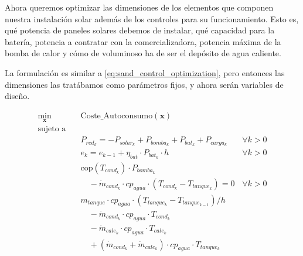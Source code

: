 Ahora queremos optimizar las dimensiones de los elementos que componen nuestra
instalación solar además de los controles para su funcionamiento. Esto es, qué
potencia de paneles solares debemos de instalar, qué capacidad para la batería,
potencia a contratar con la comercializadora, potencia máxima de la bomba de
calor y cómo de voluminoso ha de ser el depósito de agua caliente.

La formulación es similar a \eqref{eq:sand_control_optimization}, pero entonces
las dimensiones las tratábamos como parámetros fijos, y ahora serán variables
de diseño.

\begin{align}
	\min_{\mathbf{x}} \quad & \text{Coste\_Autoconsumo}(\mathbf{x}) \label{eq:regulated_sizing_optimization}                                                   \\
	\text{sujeto a} \quad   & \nonumber                                                                                                                        \\
	                        & P_{red_k} = -P_{solar_k} + P_{bomba_k} + P_{bat_k} + P_{carga_k} \quad                                           & \forall k > 0 \\
	                        & e_k = e_{k-1} + \eta_{bat} \cdot P_{bat_k} \cdot h \quad                                                         & \forall k > 0 \\
	                        & \text{cop}(T_{cond_k}) \cdot P_{bomba_k} \nonumber                                                                               \\
	                        & \quad - \dot{m}_{cond_k} \cdot cp_{agua} \cdot (T_{cond_k} - T_{tanque_k}) = 0                                   & \forall k > 0 \\
	                        & m_{tanque} \cdot cp_{agua} \cdot ( T_{tanque_k} - T_{tanque_{k-1}}) / h  \nonumber                                               \\
	                        & \quad - \dot{m}_{cond_k} \cdot cp_{agua} \cdot T_{cond_k} \nonumber                                                              \\
	                        & \quad - \dot{m}_{cale_k} \cdot cp_{agua} \cdot T_{cale_k} \nonumber                                                              \\
	                        & \quad + (\dot{m}_{cond_k} + \dot{m}_{cale_k}) \cdot cp_{agua} \cdot T_{tanque_k} \nonumber                                       \\

\end{align}
